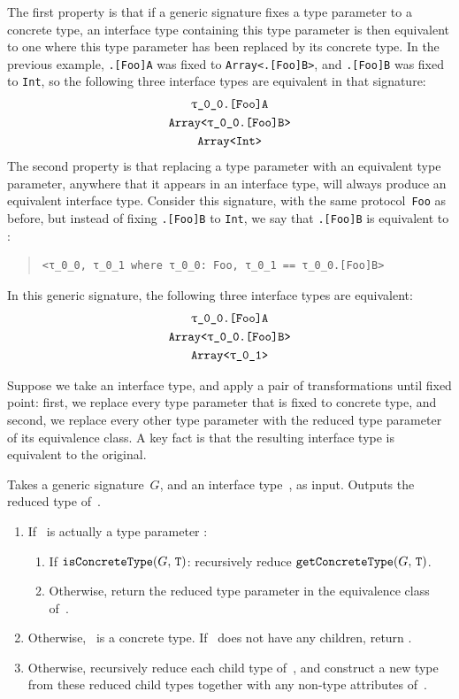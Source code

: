 \documentclass[../generics]{subfiles}
\begin{document}
The first property is that if a generic signature fixes a type parameter to a concrete type, an interface type containing this type parameter is then equivalent to one where this type parameter has been replaced by its concrete type. In the previous example, \texttt{\rT.[Foo]A} was fixed to \texttt{Array<\rT.[Foo]B>}, and \texttt{\rT.[Foo]B} was fixed to \texttt{Int}, so the following three interface types are equivalent in that signature:
\begin{gather*}
\texttt{\rT.[Foo]A}\\
\texttt{Array<\rT.[Foo]B>}\\
\texttt{Array<Int>}
\end{gather*}
The second property is that replacing a type parameter with an equivalent type parameter, anywhere that it appears in an interface type, will always produce an equivalent interface type. Consider this signature, with the same protocol~\texttt{Foo} as before, but instead of fixing \texttt{\rT.[Foo]B} to \texttt{Int}, we say that \texttt{\rT.[Foo]B} is equivalent to \rU:
\begin{quote}
\begin{verbatim}
<τ_0_0, τ_0_1 where τ_0_0: Foo, τ_0_1 == τ_0_0.[Foo]B>
\end{verbatim}
\end{quote}
In this generic signature, the following three interface types are equivalent:
\begin{gather*}
\texttt{\rT.[Foo]A}\\
\texttt{Array<\rT.[Foo]B>}\\
\texttt{Array<\rU>}
\end{gather*}

Suppose we take an interface type, and apply a pair of transformations until fixed point: first, we replace every type parameter that is fixed to concrete type, and second, we replace every other type parameter with the reduced type parameter of its equivalence class. A key fact is that the resulting interface type is equivalent to the original.

\begin{algorithm}\label{reduced type algorithm}
Takes a generic signature~$G$, and an interface type~\tX, as input. Outputs the reduced type of~\tX.
\begin{enumerate}
\item If \tX\ is actually a type parameter \tT:
\begin{enumerate}
\item If $\texttt{isConcreteType}(G,\,\texttt{T})$: recursively reduce $\texttt{getConcreteType}(G,\,\texttt{T})$.
\item Otherwise, return the reduced type parameter in the equivalence class of~\tT.
\end{enumerate}
\item Otherwise, \tX\ is a concrete type. If \tX\ does not have any children, return \tX.
\item Otherwise, recursively reduce each child type of~\tX, and construct a new type from these reduced child types together with any non-type attributes of~\tX.
\end{enumerate}
\end{algorithm}
\end{document}
